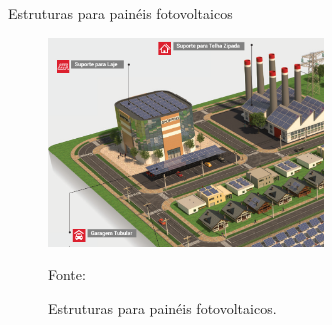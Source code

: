 \documentclass{beamer}
\begin{document}
\begin{frame}{Estruturas para painéis fotovoltaicos}

\begin{figure}[H]
    \centering
    \includegraphics[width=0.65\textwidth]{./Figuras/estruturas.png}
    \caption{Estruturas para painéis fotovoltaicos.}{Fonte: \cite{romagnole}}
   \label{fig:estruturas}
\end{figure}


\end{frame}

\end{document}
